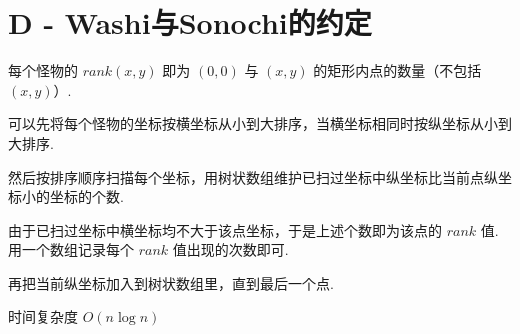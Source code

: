 \documentclass{ctexart}
\begin{document}
\section*{D - Washi与Sonochi的约定}

每个怪物的 $rank(x,y)$ 即为 $(0,0)$ 与 $(x,y)$ 的矩形内点的数量（不包括$(x,y)$）.

可以先将每个怪物的坐标按横坐标从小到大排序，当横坐标相同时按纵坐标从小到大排序.

然后按排序顺序扫描每个坐标，用树状数组维护已扫过坐标中纵坐标比当前点纵坐标小的坐标的个数.

由于已扫过坐标中横坐标均不大于该点坐标，于是上述个数即为该点的 $rank$ 值.
用一个数组记录每个 $rank$ 值出现的次数即可.

再把当前纵坐标加入到树状数组里，直到最后一个点.

时间复杂度 $O(n\log{n})$
\end{document}
